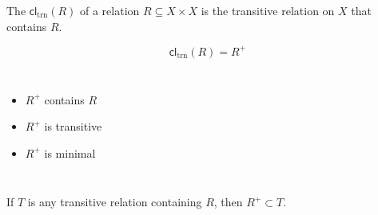 \begin{frame}{}
  \begin{definition}
    The  $\textsf{cl}_{\text{trn}}(R)$
    of a relation $R \subseteq X \times X$
    is the  transitive relation on $X$ that contains $R$.
  \end{definition}

  \pause
  \[
    \textsf{cl}_{\text{trn}}(R) = R^{+}
  \]

  \pause
  \begin{columns}
      \begin{itemize}
        \item $R^{+}$ contains $R$
        \item $R^{+}$ is transitive
        \item $R^{+}$ is minimal
      \end{itemize}
  \end{columns}

  \pause
  \vspace{0.50cm}
  \begin{center}
    If $T$ is any transitive relation containing $R$, then $R^{+} \subset T$.

    \pause
    \vspace{0.20cm}
  \end{center}
\end{frame}

